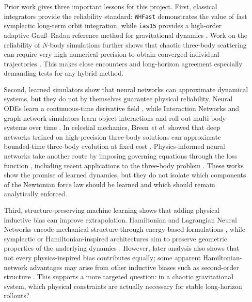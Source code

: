 \documentclass[12pt]{article}
\begin{document}
Prior work gives three important lessons for this project. First, classical integrators
provide the reliability standard: \texttt{WHFast} demonstrates the value of fast
symplectic long-term orbit integration, while \texttt{ias15} provides a high-order
adaptive Gau\ss--Radau reference method for gravitational dynamics
\cite{Rein_2015,Rein_2014}. Work on the reliability of $N$-body simulations further
shows that chaotic three-body scattering can require very high numerical precision to
obtain converged individual trajectories \cite{boekholt2015reliability}. This makes
close encounters and long-horizon agreement especially demanding tests for any hybrid
method.

Second, learned simulators show that neural networks can approximate dynamical systems,
but they do not by themselves guarantee physical reliability. Neural ODEs learn a
continuous-time derivative field \cite{chen2018neuralode}, while Interaction Networks
and graph-network simulators learn object interactions and roll out multi-body systems
over time \cite{battaglia2016interaction,sanchez2020learning}. In celestial mechanics,
Breen \emph{et al.} showed that deep networks trained on high-precision three-body
solutions can approximate bounded-time three-body evolution at fixed cost
\cite{breen2020newton}. Physics-informed neural networks take another route by imposing
governing equations through the loss function \cite{cuomo2022scientific}, including
recent applications to the three-body problem \cite{pereira2025advancing}. These works
show the promise of learned dynamics, but they do not isolate which components of the
Newtonian force law should be learned and which should remain analytically enforced.

Third, structure-preserving machine learning shows that adding physical inductive bias
can improve extrapolation. Hamiltonian and Lagrangian Neural Networks encode mechanical
structure through energy-based formulations \cite{greydanus2019hamiltonian,cranmer2020lagrangian},
while symplectic or Hamiltonian-inspired architectures aim to preserve geometric
properties of the underlying dynamics \cite{zhong2020symoden,jin2020sympnets,tong2021symplectic,david2023symplectic,horn2025generalized}. However, later analysis also shows that
not every physics-inspired bias contributes equally; some apparent Hamiltonian-network
advantages may arise from other inductive biases such as second-order structure
\cite{gruver2022deconstructing}. This supports a more targeted question: in a chaotic
gravitational system, which physical constraints are actually necessary for stable
long-horizon rollouts?
\end{document}
